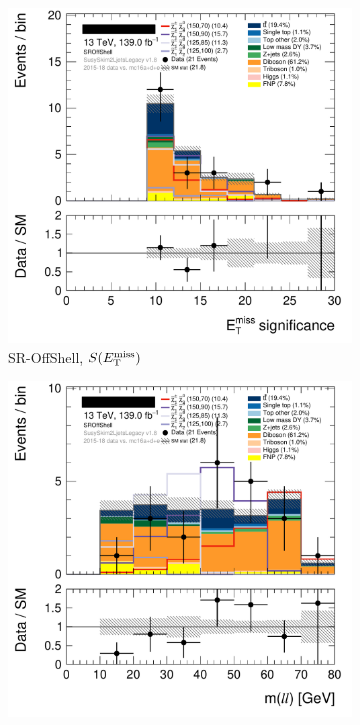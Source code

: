 \begin{figure}[tp]
\centering
\begin{subfigure}{0.48\textwidth}
\centering
\includegraphics[width=\textwidth]{figures/2ljets_def_met_Sign_SROffShell.png}
\caption{SR-OffShell, $S(E_\mathrm{T}^\mathrm{miss})$}
\end{subfigure}
\hfill
\begin{subfigure}{0.48\textwidth}
\centering
\includegraphics[width=\textwidth]{figures/2ljets_def_mll_SROffShell.png}

\end{subfigure}
\end{figure}
